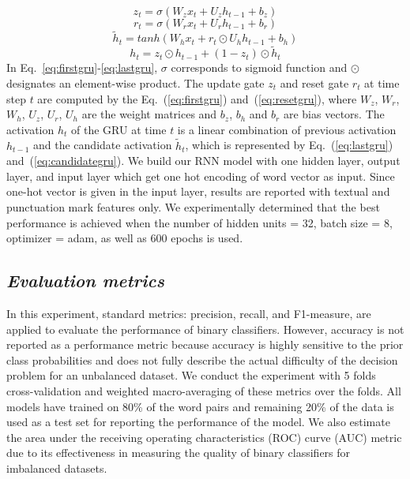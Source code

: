 \documentclass{amia}
\begin{document}
\begin{equation}
z_t = \sigma(W_zx_t + U_zh_{t-1} + b_z)
\label{eq:firstgru}
\end{equation}
\begin{equation}
r_t = \sigma(W_rx_t + U_rh_{t-1} + b_r)
\label{eq:resetgru}
\end{equation}
\begin{equation}
\tilde h_t = tanh(W_hx_t + r_t \odot U_hh_{t-1} + b_h) 
\label{eq:candidategru}
\end{equation}
\begin{equation}
h_t = z_t \odot h_{t-1} + (1-z_t) \odot \tilde h_t
\label{eq:lastgru}
\end{equation}  
In Eq.~\ref{eq:firstgru}-\ref{eq:lastgru}, $\sigma$ corresponds to sigmoid function and $\odot$ designates an element-wise product. The update gate $z_t$ and reset gate $r_t$ at time step $t$ are computed by the Eq.~(\ref{eq:firstgru}) and~(\ref{eq:resetgru}), where $W_z$, $W_r$, $W_h$, $U_z$, $U_r$, $U_h$ are the weight matrices and $b_z$, $b_h$ and $b_r$ are bias vectors. The activation $h_t$ of the GRU at time $t$ is a linear combination of previous activation $h_{t-1}$ and the candidate activation $\tilde h_t$, which is represented by Eq.~(\ref{eq:lastgru}) and~(\ref{eq:candidategru}). We build our RNN model with one hidden layer, output layer, and input layer which get one hot encoding of word vector as input. Since one-hot vector is given in the input layer, results are reported with textual and punctuation mark features only. We experimentally determined that the best performance is achieved when the number of hidden units = 32, batch size = 8, optimizer = adam, as well as 600 epochs is used.         
  
\subsection*{\textit{Evaluation metrics}}
In this experiment, standard metrics: precision, recall, and F1-measure, are applied to evaluate the performance of binary classifiers\cite{aas1999text}. However, accuracy is not reported as a performance metric because accuracy is highly sensitive to the prior class probabilities and does not fully describe the actual difficulty of the decision problem for an unbalanced dataset. We conduct the experiment with 5 folds cross-validation and weighted macro-averaging of these metrics over the folds. All models have trained on 80\% of the word pairs and remaining 20\% of the data is used as a test set for reporting the performance of the model. We also estimate the area under the receiving operating characteristics (ROC) curve\cite{kumar2011receiver} (AUC) metric due to its effectiveness in measuring the quality of binary classifiers for imbalanced datasets\cite{hu2015kernelized}. 
\end{document}
